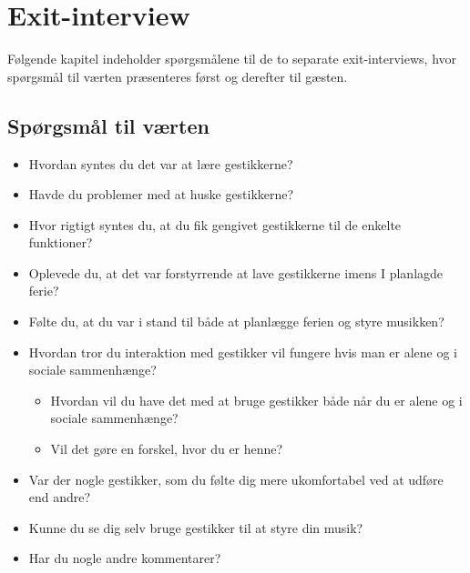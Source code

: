 \chapter{Exit-interview}
\label{app:ExitInterviewSocialAccept}
%
Følgende kapitel indeholder spørgsmålene til de to separate exit-interviews, hvor spørgsmål til værten præsenteres først og derefter til gæsten. \blankline
%
\section{Spørgsmål til værten}
\label{app:ExitInterviewVaert}
%
\begin{itemize}
  \item Hvordan syntes du det var at lære gestikkerne?
  \item Havde du problemer med at huske gestikkerne?
  \item Hvor rigtigt syntes du, at du fik gengivet gestikkerne til de enkelte funktioner? 
  \item Oplevede du, at det var forstyrrende at lave gestikkerne imens I planlagde ferie? 
  \item Følte du, at du var i stand til både at planlægge ferien og styre musikken?
  \item Hvordan tror du interaktion med gestikker vil fungere hvis man er alene og i sociale sammenhænge?
  \begin{itemize}
  	\item Hvordan vil du have det med at bruge gestikker både når du er alene og i sociale sammenhænge?
  	\item Vil det gøre en forskel, hvor du er henne?
  \end{itemize}  
  \item Var der nogle gestikker, som du følte dig mere ukomfortabel ved at udføre end andre? 
  \item Kunne du se dig selv bruge gestikker til at styre din musik? 
  \item Har du nogle andre kommentarer? 
\end{itemize}
%
